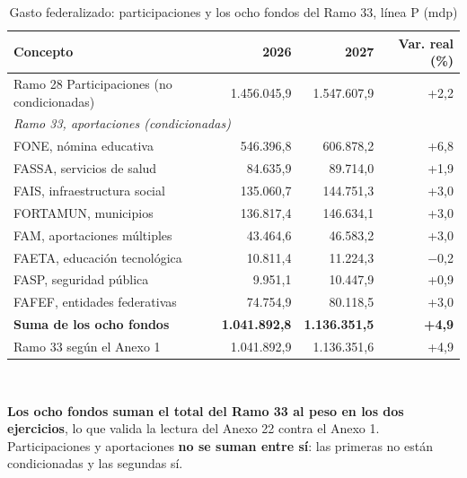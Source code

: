 \begin{table}[htbp]\centering\footnotesize
\caption{Gasto federalizado: participaciones y los ocho fondos del Ramo 33, línea P (mdp)}\label{cua:feder}
\begin{tabular}{lrrr}
\toprule
Concepto & 2026 & 2027 & Var. real (\%) \\
\midrule
Ramo 28 Participaciones (no condicionadas) & 1.456.045,9 & 1.547.607,9 & +2,2 \\
\midrule \multicolumn{4}{l}{\emph{Ramo 33, aportaciones (condicionadas)}} \\
\quad FONE, nómina educativa & 546.396,8 & 606.878,2 & +6,8 \\
\quad FASSA, servicios de salud & 84.635,9 & 89.714,0 & +1,9 \\
\quad FAIS, infraestructura social & 135.060,7 & 144.751,3 & +3,0 \\
\quad FORTAMUN, municipios & 136.817,4 & 146.634,1 & +3,0 \\
\quad FAM, aportaciones múltiples & 43.464,6 & 46.583,2 & +3,0 \\
\quad FAETA, educación tecnológica & 10.811,4 & 11.224,3 & $-$0,2 \\
\quad FASP, seguridad pública & 9.951,1 & 10.447,9 & +0,9 \\
\quad FAFEF, entidades federativas & 74.754,9 & 80.118,5 & +3,0 \\
\textbf{Suma de los ocho fondos} & \textbf{1.041.892,8} & \textbf{1.136.351,5} & \textbf{+4,9} \\
Ramo 33 según el Anexo 1 & 1.041.892,9 & 1.136.351,6 & +4,9 \\
\bottomrule
\end{tabular}
\\[2pt]\begin{minipage}{0.92\textwidth}\scriptsize \textbf{Los ocho fondos suman el total del Ramo 33 al peso en los dos ejercicios}, lo que valida la lectura del Anexo 22 contra el Anexo 1. Participaciones y aportaciones \textbf{no se suman entre sí}: las primeras no están condicionadas y las segundas sí.\end{minipage}
\end{table}
